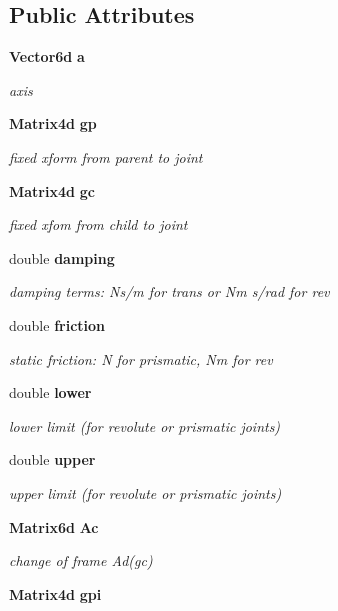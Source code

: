 \subsection*{\-Public \-Attributes}
\begin{DoxyCompactItemize}
\item 
{\bf \-Vector6d} {\bf a}
\begin{DoxyCompactList}\small\item\em axis \end{DoxyCompactList}\item 
{\bf \-Matrix4d} {\bf gp}
\begin{DoxyCompactList}\small\item\em fixed xform from parent to joint \end{DoxyCompactList}\item 
{\bf \-Matrix4d} {\bf gc}
\begin{DoxyCompactList}\small\item\em fixed xfom from child to joint \end{DoxyCompactList}\item 
double {\bf damping}
\begin{DoxyCompactList}\small\item\em damping terms\-: \-Ns/m for trans or \-Nm s/rad for rev \end{DoxyCompactList}\item 
double {\bf friction}
\begin{DoxyCompactList}\small\item\em static friction\-: \-N for prismatic, \-Nm for rev \end{DoxyCompactList}\item 
double {\bf lower}
\begin{DoxyCompactList}\small\item\em lower limit (for revolute or prismatic joints) \end{DoxyCompactList}\item 
double {\bf upper}
\begin{DoxyCompactList}\small\item\em upper limit (for revolute or prismatic joints) \end{DoxyCompactList}\item 
{\bf \-Matrix6d} {\bf \-Ac}
\begin{DoxyCompactList}\small\item\em change of frame \-Ad(gc) \end{DoxyCompactList}\item 
{\bf \-Matrix4d} {\bf gpi}

\end{DoxyCompactItemize}
